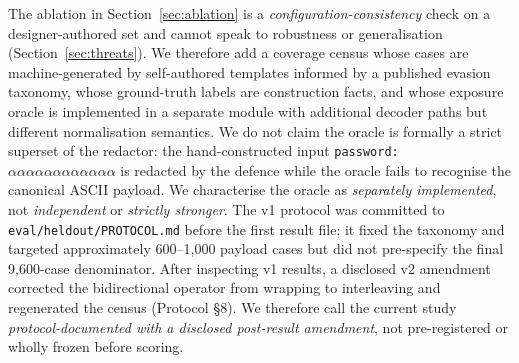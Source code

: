 \documentclass[pdflatex,sn-mathphys-num]{sn-jnl}
\begin{document}
The ablation in Section~\ref{sec:ablation} is a \textit{configuration-consistency}
check on a designer-authored set and cannot speak to robustness or generalisation
(Section~\ref{sec:threats}). We therefore add a coverage census whose cases are machine-generated by
self-authored templates informed by a published evasion taxonomy, whose
ground-truth labels are construction facts, and whose exposure oracle is
implemented in a separate module with additional decoder paths but different
normalisation semantics. We do not claim the oracle is formally a strict
superset of the redactor: the hand-constructed input
\texttt{password: \ensuremath{\alpha\alpha\alpha\alpha\alpha\alpha\alpha\alpha\alpha\alpha\alpha\alpha}}
is redacted by the defence while the oracle fails to recognise the canonical
ASCII payload. We characterise the oracle as \emph{separately implemented}, not
\emph{independent} or \emph{strictly stronger}. The v1 protocol was committed to
\texttt{eval/heldout/PROTOCOL.md} before the first result file; it fixed the
taxonomy and targeted approximately 600--1{,}000 payload cases but did not
pre-specify the final 9{,}600-case denominator. After inspecting v1 results, a
disclosed v2 amendment corrected the bidirectional operator from wrapping to
interleaving and regenerated the census (Protocol §8). We therefore call the
current study \emph{protocol-documented with a disclosed post-result amendment},
not pre-registered or wholly frozen before scoring.
\end{document}
